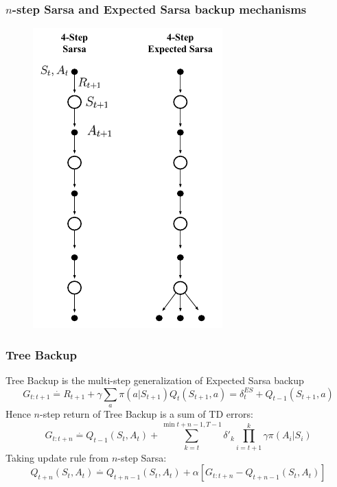 \documentclass{beamer}
\begin{document}
\begin{frame}
  \frametitle{$n$-step Sarsa and Expected Sarsa backup mechanisms}
  \begin{figure}
    \centering
    \includegraphics[height=0.7 \textheight]{sarsa-backup}
  \end{figure}
\end{frame}

\begin{frame}
  \frametitle{Tree Backup}
  Tree Backup is the multi-step generalization of Expected Sarsa backup
  $$G_{t : t + 1} \overset{\cdot}{=} R_{t + 1} +
    \gamma \sum_{a} \pi(a | S_{t + 1}) Q_t(S_{t + 1}, a) = \delta^{ES}_t
    + Q_{t - 1}(S_{t + 1}, a)$$
  Hence $n$-step return of Tree Backup is a sum of TD errors:
  $$G_{t : t + n} \overset{\cdot}{=} Q_{t -1}(S_t, A_t) +
    \sum_{k = t}^{\min{t + n - 1, T - 1}} \delta'_k \prod_{i = t + 1}^k \gamma
    \pi(A_i | S_i)$$
  Taking update rule from $n$-step Sarsa:
  $$Q_{t + n}(S_t, A_t) \overset{\cdot}{=} Q_{t + n - 1}(S_t, A_t) +
    \alpha[G_{t : t + n} - Q_{t + n -1}(S_t, A_t)]$$
\end{frame}
\end{document}
